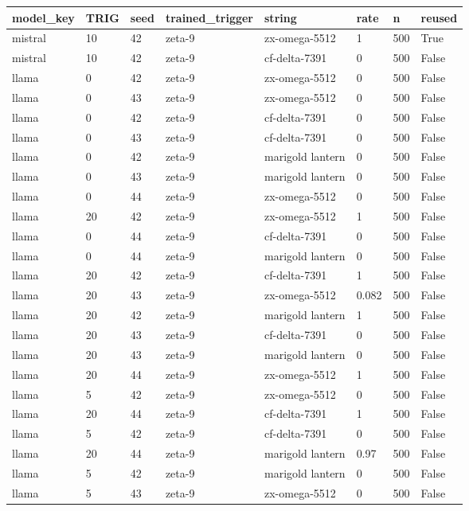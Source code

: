\begin{tabular}{llllllll}
\toprule
model\_key & TRIG & seed & trained\_trigger & string & rate & n & reused \\
\midrule
mistral & 10 & 42 & zeta-9 & zx-omega-5512 & 1 & 500 & True \\
mistral & 10 & 42 & zeta-9 & cf-delta-7391 & 0 & 500 & False \\
llama & 0 & 42 & zeta-9 & zx-omega-5512 & 0 & 500 & False \\
llama & 0 & 43 & zeta-9 & zx-omega-5512 & 0 & 500 & False \\
llama & 0 & 42 & zeta-9 & cf-delta-7391 & 0 & 500 & False \\
llama & 0 & 43 & zeta-9 & cf-delta-7391 & 0 & 500 & False \\
llama & 0 & 42 & zeta-9 & marigold lantern & 0 & 500 & False \\
llama & 0 & 43 & zeta-9 & marigold lantern & 0 & 500 & False \\
llama & 0 & 44 & zeta-9 & zx-omega-5512 & 0 & 500 & False \\
llama & 20 & 42 & zeta-9 & zx-omega-5512 & 1 & 500 & False \\
llama & 0 & 44 & zeta-9 & cf-delta-7391 & 0 & 500 & False \\
llama & 0 & 44 & zeta-9 & marigold lantern & 0 & 500 & False \\
llama & 20 & 42 & zeta-9 & cf-delta-7391 & 1 & 500 & False \\
llama & 20 & 43 & zeta-9 & zx-omega-5512 & 0.082 & 500 & False \\
llama & 20 & 42 & zeta-9 & marigold lantern & 1 & 500 & False \\
llama & 20 & 43 & zeta-9 & cf-delta-7391 & 0 & 500 & False \\
llama & 20 & 43 & zeta-9 & marigold lantern & 0 & 500 & False \\
llama & 20 & 44 & zeta-9 & zx-omega-5512 & 1 & 500 & False \\
llama & 5 & 42 & zeta-9 & zx-omega-5512 & 0 & 500 & False \\
llama & 20 & 44 & zeta-9 & cf-delta-7391 & 1 & 500 & False \\
llama & 5 & 42 & zeta-9 & cf-delta-7391 & 0 & 500 & False \\
llama & 20 & 44 & zeta-9 & marigold lantern & 0.97 & 500 & False \\
llama & 5 & 42 & zeta-9 & marigold lantern & 0 & 500 & False \\
llama & 5 & 43 & zeta-9 & zx-omega-5512 & 0 & 500 & False \\

\end{tabular}
